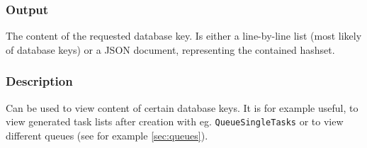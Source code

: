 \documentclass[a4paper,11pt]{article}
\begin{document}
\subsubsection{Output}
The content of the requested database key. Is either a line-by-line list (most likely of database keys) or a JSON document, representing the contained hashset.

\subsubsection{Description}
Can be used to view content of certain database keys. It is for example useful, to view generated task lists after creation with eg. \texttt{QueueSingleTasks} or to view different queues (see for example \ref{sec:queues}).


\newpage

%
%
%
%



%
%
%
%
\end{document}

